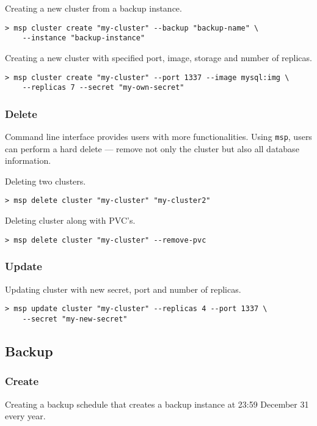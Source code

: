 \noindent Creating a new cluster from a backup instance.

\begin{lstlisting}
> msp cluster create "my-cluster" --backup "backup-name" \
	--instance "backup-instance"
\end{lstlisting}

\noindent Creating a new cluster with specified port, image, storage and number of replicas.

\begin{lstlisting}
> msp cluster create "my-cluster" --port 1337 --image mysql:img \
	--replicas 7 --secret "my-own-secret"
\end{lstlisting}

\subsubsection*{Delete}

Command line interface provides users with more functionalities. Using 
\texttt{msp}, users can perform a hard delete --- remove not only the 
cluster but also all database information.

\noindent Deleting two clusters.

\begin{lstlisting}
> msp delete cluster "my-cluster" "my-cluster2"
\end{lstlisting}

\noindent Deleting cluster along with PVC’s.

\begin{lstlisting}
> msp delete cluster "my-cluster" --remove-pvc
\end{lstlisting}

\subsubsection*{Update}
\noindent Updating cluster with new secret, port and number of replicas.

\begin{lstlisting}
> msp update cluster "my-cluster" --replicas 4 --port 1337 \
	--secret "my-new-secret"
\end{lstlisting}

\subsection{Backup}

\subsubsection*{Create}
\noindent Creating a backup schedule that creates a backup instance at 23:59 December 31 every year.

